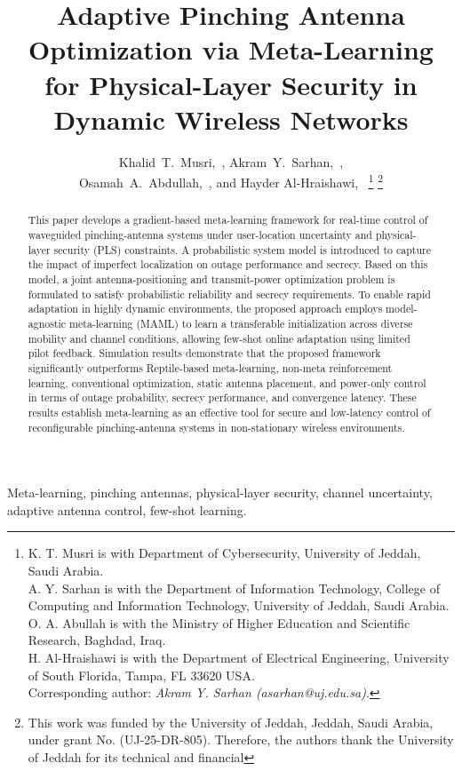 \documentclass[journal,10pt]{IEEEtran}
\title{Adaptive Pinching Antenna Optimization via Meta-Learning for Physical-Layer Security in Dynamic Wireless Networks}
\author{{Khalid~T.~Musri,~\IEEEmembership{Member,~IEEE},  Akram~Y.~Sarhan,~\IEEEmembership{Member,~IEEE},\\ Osamah~A.~Abdullah,~\IEEEmembership{Member,~IEEE}, and Hayder Al-Hraishawi,~\IEEEmembership{Senior Member,~IEEE}
\thanks{
K. T. Musri is with Department of Cybersecurity, University of Jeddah, Saudi Arabia.\\
A. Y. Sarhan is with the Department of Information Technology, College of Computing and Information Technology, University of Jeddah, Saudi Arabia.\\
O. A. Abullah is with the Ministry of Higher Education and Scientific Research, Baghdad, Iraq.\\
H. Al-Hraishawi is with the Department of Electrical Engineering, University of South Florida, Tampa, FL 33620 USA.\\
Corresponding author: \emph{Akram Y. Sarhan (asarhan@uj.edu.sa)}.}
\thanks{This work was funded by the University of Jeddah, Jeddah, Saudi Arabia, under grant No. (UJ-25-DR-805). Therefore, the authors thank the University of Jeddah for its technical and financial}}}
\begin{document}
\maketitle



\begin{abstract}
This paper develops a gradient-based meta-learning framework for real-time control of waveguided pinching-antenna systems under user-location uncertainty and physical-layer security (PLS) constraints. A probabilistic system model is introduced to capture the impact of imperfect localization on outage performance and secrecy. Based on this model, a joint antenna-positioning and transmit-power optimization problem is formulated to satisfy probabilistic reliability and secrecy requirements. To enable rapid adaptation in highly dynamic environments, the proposed approach employs model-agnostic meta-learning (MAML) to learn a transferable initialization across diverse mobility and channel conditions, allowing few-shot online adaptation using limited pilot feedback. Simulation results demonstrate that the proposed framework significantly outperforms Reptile-based meta-learning, non-meta reinforcement learning, conventional optimization, static antenna placement, and power-only control in terms of outage probability, secrecy performance, and convergence latency. These results establish meta-learning as an effective tool for secure and low-latency control of reconfigurable pinching-antenna systems in non-stationary wireless environments.
\end{abstract}

\begin{IEEEkeywords}
Meta-learning, pinching antennas, physical-layer security, channel uncertainty, adaptive antenna control, few-shot learning.
\end{IEEEkeywords}





\end{document}
